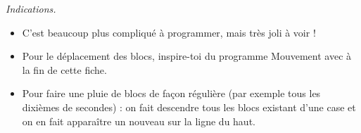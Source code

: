 \documentclass[11pt,class=report,crop=false]{standalone}
\begin{document}
\begin{activite}
\emph{Indications.} 
\begin{itemize}
  \item C'est beaucoup plus compliqué à programmer, mais très joli à voir ! 
  \item Pour le déplacement des blocs, inspire-toi du programme \og{}Mouvement avec \fg{} à la fin de cette fiche.
  \item Pour faire une \og{}pluie de blocs\fg{} de façon régulière (par exemple tous les dixièmes de secondes) : on fait descendre tous les blocs existant d'une case et on en fait apparaître un nouveau sur la ligne du haut.
\end{itemize}
\end{activite}





\end{document}
